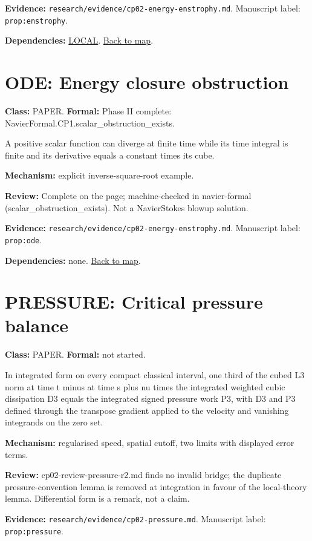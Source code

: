 \documentclass[10pt]{article}
\begin{document}
\textbf{Evidence:} \texttt{research/evidence/cp02-energy-enstrophy.md}. Manuscript label: \texttt{prop:enstrophy}.

\textbf{Dependencies:} \hyperref[node:LOCAL]{LOCAL}. \hyperref[map]{Back to map}.

\section*{ODE: Energy closure obstruction}\label{node:ODE}
\textbf{Class:} PAPER. \textbf{Formal:} Phase II complete: NavierFormal.CP1.scalar\_obstruction\_exists.

A positive scalar function can diverge at finite time while its time integral is finite and its derivative equals a constant times its cube.

\textbf{Mechanism:} explicit inverse-square-root example.

\textbf{Review:} Complete on the page; machine-checked in navier-formal (scalar\_obstruction\_exists). Not a Navier\textendash{}\allowbreak{}Stokes blowup solution.

\textbf{Evidence:} \texttt{research/evidence/cp02-energy-enstrophy.md}. Manuscript label: \texttt{prop:ode}.

\textbf{Dependencies:} none. \hyperref[map]{Back to map}.

\section*{PRESSURE: Critical pressure balance}\label{node:PRESSURE}
\textbf{Class:} PAPER. \textbf{Formal:} not started.

In integrated form on every compact classical interval, one third of the cubed L3 norm at time t minus at time s plus nu times the integrated weighted cubic dissipation D3 equals the integrated signed pressure work P3, with D3 and P3 defined through the transpose gradient applied to the velocity and vanishing integrands on the zero set.

\textbf{Mechanism:} regularised speed, spatial cutoff, two limits with displayed error terms.

\textbf{Review:} cp02-review-pressure-r2.md finds no invalid bridge; the duplicate pressure-convention lemma is removed at integration in favour of the local-theory lemma. Differential form is a remark, not a claim.

\textbf{Evidence:} \texttt{research/evidence/cp02-pressure.md}. Manuscript label: \texttt{prop:pressure}.
\end{document}
